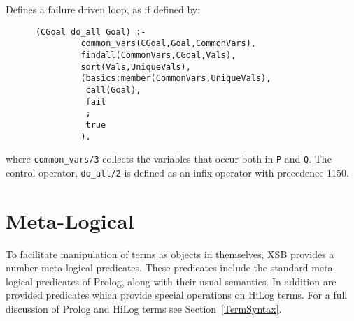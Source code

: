 \begin{description}
Defines a failure driven loop, as if defined by:
	\begin{center}
	\begin{minipage}{2.10in}
	\begin{verbatim}
	  (CGoal do_all Goal) :-
               common_vars(CGoal,Goal,CommonVars),
               findall(CommonVars,CGoal,Vals),
               sort(Vals,UniqueVals),
               (basics:member(CommonVars,UniqueVals),
                call(Goal),
                fail
                ;
                true
               ).
	\end{verbatim}
	\end{minipage}
	\end{center}
where {\tt common\_vars/3} collects the variables that occur
both in {\tt P} and {\tt Q}.
The control operator, {\tt do\_all/2} is defined as an infix operator
with precedence 1150.


\end{description}



\section{Meta-Logical}\label{MetaLogical}

To facilitate manipulation of terms as objects in themselves,
XSB provides a number meta-logical predicates.  These
predicates include the standard meta-logical predicates of Prolog,
along with their usual semantics.  In addition are provided predicates
which provide special operations on HiLog terms.  For a full
discussion of Prolog and HiLog terms see Section~\ref{TermSyntax}.

